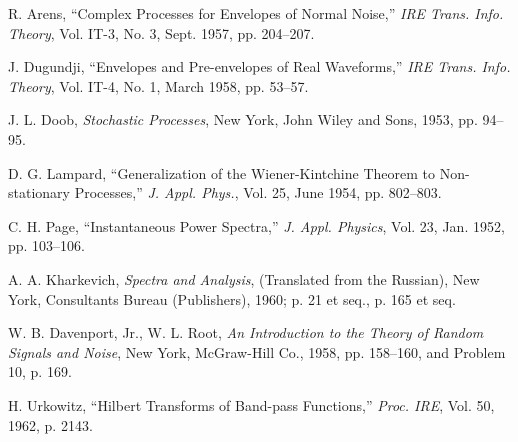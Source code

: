 \documentclass{article}
\newcommand{\tmem}[1]{{\em #1\/}}
\begin{document}
\begin{thebibliography}{8}
  {}R. Arens, ``Complex Processes for Envelopes of Normal
  Noise,'' {\tmem{IRE Trans. Info. Theory}}, Vol. IT-3, No. 3, Sept. 1957, pp.
  204--207.
  
  {}J. Dugundji, ``Envelopes and Pre-envelopes of Real
  Waveforms,'' {\tmem{IRE Trans. Info. Theory}}, Vol. IT-4, No. 1, March 1958,
  pp. 53--57.
  
  {}J. L. Doob, {\tmem{Stochastic Processes}}, New York,
  John Wiley and Sons, 1953, pp. 94--95.
  
  {}D. G. Lampard, ``Generalization of the
  Wiener-Kintchine Theorem to Non-stationary Processes,'' {\tmem{J. Appl.
  Phys.}}, Vol. 25, June 1954, pp. 802--803.
  
  {}C. H. Page, ``Instantaneous Power Spectra,'' {\tmem{J.
  Appl. Physics}}, Vol. 23, Jan. 1952, pp. 103--106.
  
  {}A. A. Kharkevich, {\tmem{Spectra and Analysis}},
  (Translated from the Russian), New York, Consultants Bureau (Publishers),
  1960; p. 21 et seq., p. 165 et seq.
  
  {}W. B. Davenport, Jr., W. L. Root, {\tmem{An
  Introduction to the Theory of Random Signals and Noise}}, New York,
  McGraw-Hill Co., 1958, pp. 158--160, and Problem 10, p. 169.
  
  {}H. Urkowitz, ``Hilbert Transforms of Band-pass
  Functions,'' {\tmem{Proc. IRE}}, Vol. 50, 1962, p. 2143.
\end{thebibliography}
\end{document}
